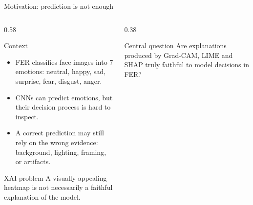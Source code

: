 \documentclass[aspectratio=169,10pt]{beamer}
\begin{document}
\begin{frame}{Motivation: prediction is not enough}
  \begin{columns}[T,totalwidth=\textwidth]
    \begin{column}{0.58\textwidth}
      \begin{block}{Context}
        \begin{itemize}
          \item FER classifies face images into 7 emotions: neutral, happy, sad, surprise, fear, disgust, anger.
          \item CNNs can predict emotions, but their decision process is hard to inspect.
          \item A correct prediction may still rely on the wrong evidence: background, lighting, framing, or artifacts.
        \end{itemize}
      \end{block}
      \begin{alertblock}{XAI problem}
        A visually appealing heatmap is not necessarily a faithful explanation of the model.
      \end{alertblock}
    \end{column}
    \begin{column}{0.38\textwidth}
      \begin{block}{Central question}
        \centering
        \large
        Are explanations produced by Grad-CAM, LIME and SHAP truly faithful to model decisions in FER?
      \end{block}
    \end{column}
  \end{columns}
\end{frame}
\end{document}
